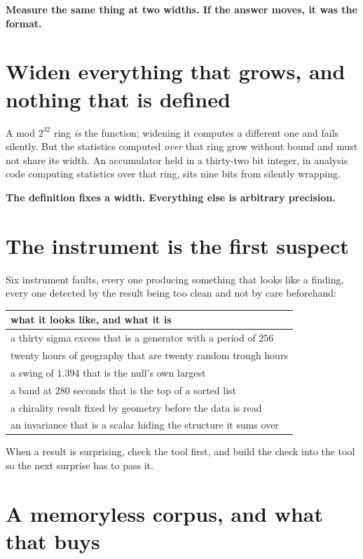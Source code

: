 \textbf{Measure the same thing at two widths. If the answer moves, it was the format.}

\section{Widen everything that grows, and nothing that is defined}

A mod \(2^{32}\) ring \emph{is} the function; widening it computes a different one and fails silently. But the statistics computed \emph{over} that ring grow without bound and must not share its width. An accumulator held in a thirty-two bit integer, in analysis code computing statistics over that ring, sits nine bits from silently wrapping.

\textbf{The definition fixes a width. Everything else is arbitrary precision.}

\section{The instrument is the first suspect}

Six instrument faults, every one producing something that looks like a finding, every one detected by the result being too clean and not by care beforehand:

\begin{center}
\begin{tabular}{@{}l@{}}
\toprule
what it looks like, and what it is \\
\midrule
a thirty sigma excess that is a generator with a period of \(256\) \\
twenty hours of geography that are twenty random trough hours \\
a swing of \(1.394\) that is the null's own largest \\
a band at \(280\) seconds that is the top of a sorted list \\
a chirality result fixed by geometry before the data is read \\
an invariance that is a scalar hiding the structure it sums over \\
\bottomrule
\end{tabular}
\end{center}

When a result is surprising, check the tool first, and build the check into the tool so the next surprise has to pass it.

\section{A memoryless corpus, and what that buys}

